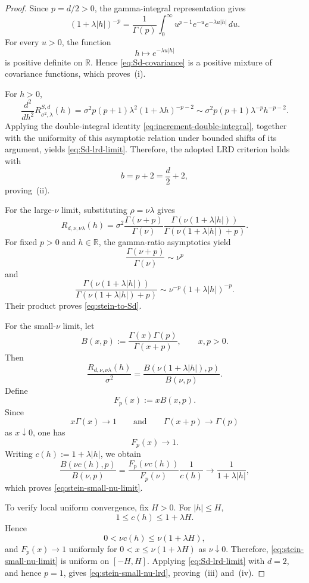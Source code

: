 \documentclass[10pt,a4paper]{amsart}
\begin{document}
\begin{proof}
Since \(p=d/2>0\), the gamma-integral representation gives
\[
(1+\lambda|h|)^{-p}
=
\frac{1}{\Gamma(p)}
\int_0^\infty
u^{p-1}e^{-u}e^{-\lambda u|h|}
\,du.
\]
For every \(u>0\), the function
\[
h\longmapsto e^{-\lambda u|h|}
\]
is positive definite on \(\mathbb R\). Hence
\eqref{eq:Sd-covariance} is a positive mixture of covariance functions,
which proves~(i).

For \(h>0\),
\[
\frac{d^2}{dh^2}
R^{S,d}_{\sigma^2,\lambda}(h)
=
\sigma^2p(p+1)\lambda^2
(1+\lambda h)^{-p-2}
\sim
\sigma^2p(p+1)\lambda^{-p}h^{-p-2}.
\]
Applying the double-integral identity
\eqref{eq:increment-double-integral}, together with the uniformity of
this asymptotic relation under bounded shifts of its argument, yields
\eqref{eq:Sd-lrd-limit}. Therefore, the adopted LRD criterion holds
with
\[
b=p+2=\frac d2+2,
\]
proving~(ii).

For the large-\(\nu\) limit, substituting
\(\rho=\nu\lambda\) gives
\[
R_{d,\nu,\nu\lambda}(h)
=
\sigma^2
\frac{\Gamma(\nu+p)}{\Gamma(\nu)}
\frac{
\Gamma\!\left(\nu(1+\lambda|h|)\right)
}{
\Gamma\!\left(\nu(1+\lambda|h|)+p\right)
}.
\]
For fixed \(p>0\) and \(h\in\mathbb R\), the gamma-ratio asymptotics
yield
\[
\frac{\Gamma(\nu+p)}{\Gamma(\nu)}
\sim\nu^p
\]
and
\[
\frac{
\Gamma\!\left(\nu(1+\lambda|h|)\right)
}{
\Gamma\!\left(\nu(1+\lambda|h|)+p\right)
}
\sim
\nu^{-p}(1+\lambda|h|)^{-p}.
\]
Their product proves \eqref{eq:stein-to-Sd}.

For the small-\(\nu\) limit, let
\[
B(x,p)
:=
\frac{\Gamma(x)\Gamma(p)}{\Gamma(x+p)},
\qquad x,p>0.
\]
Then
\[
\frac{R_{d,\nu,\nu\lambda}(h)}{\sigma^2}
=
\frac{
B\!\left(\nu(1+\lambda|h|),p\right)
}{
B(\nu,p)
}.
\]
Define
\[
F_p(x):=xB(x,p).
\]
Since
\[
x\Gamma(x)\longrightarrow1
\qquad\text{and}\qquad
\Gamma(x+p)\longrightarrow\Gamma(p)
\]
as \(x\downarrow0\), one has
\[
F_p(x)\longrightarrow1.
\]
Writing \(c(h):=1+\lambda|h|\), we obtain
\[
\frac{
B\!\left(\nu c(h),p\right)
}{
B(\nu,p)
}
=
\frac{F_p\!\left(\nu c(h)\right)}{F_p(\nu)}
\frac{1}{c(h)}
\longrightarrow
\frac{1}{1+\lambda|h|},
\]
which proves \eqref{eq:stein-small-nu-limit}.

To verify local uniform convergence, fix \(H>0\). For \(|h|\leq H\),
\[
1\leq c(h)\leq1+\lambda H.
\]
Hence
\[
0<\nu c(h)\leq\nu(1+\lambda H),
\]
and \(F_p(x)\to1\) uniformly for
\(0<x\leq\nu(1+\lambda H)\) as \(\nu\downarrow0\). Therefore,
\eqref{eq:stein-small-nu-limit} is uniform on \([-H,H]\). Applying
\eqref{eq:Sd-lrd-limit} with \(d=2\), and hence \(p=1\), gives
\eqref{eq:stein-small-nu-lrd}, proving~(iii) and~(iv).


\end{proof}
\end{document}
